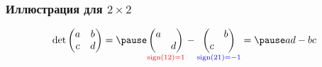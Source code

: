 \begin{frame}
    \frametitle{Иллюстрация для $2\times 2$}

    \[
    \det \begin{pmatrix}
        a & b \\
        c & d \\
    \end{pmatrix} = \pause
    \underset{\textcolor{red}{\sign(12)=1}}{\begin{pmatrix}
        a &  \\
         & d \\
    \end{pmatrix}} - 
    \underset{\textcolor{blue}{\sign(21)=-1}}{\begin{pmatrix}
         & b \\
        c &  \\
    \end{pmatrix}} = \pause  ad - bc
    \]

\end{frame}



